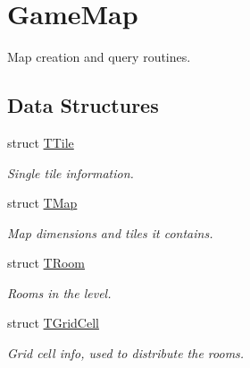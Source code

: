 \hypertarget{group__GameMap}{}\section{Game\+Map}
\label{group__GameMap}


Map creation and query routines.  


\subsection*{Data Structures}
\begin{DoxyCompactItemize}
\item 
struct \mbox{\hyperlink{structTTile}{T\+Tile}}
\begin{DoxyCompactList}\small\item\em Single tile information. \end{DoxyCompactList}\item 
struct \mbox{\hyperlink{structTMap}{T\+Map}}
\begin{DoxyCompactList}\small\item\em Map dimensions and tiles it contains. \end{DoxyCompactList}\item 
struct \mbox{\hyperlink{structTRoom}{T\+Room}}
\begin{DoxyCompactList}\small\item\em Rooms in the level. \end{DoxyCompactList}\item 
struct \mbox{\hyperlink{structTGridCell}{T\+Grid\+Cell}}
\begin{DoxyCompactList}\small\item\em Grid cell info, used to distribute the rooms. \end{DoxyCompactList}\end{DoxyCompactItemize}
